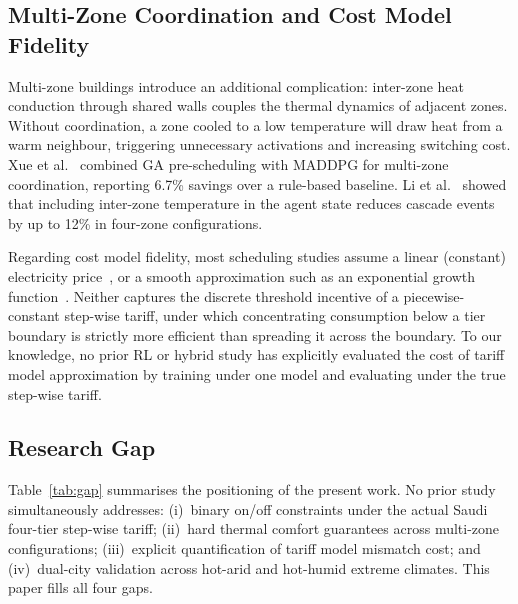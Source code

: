 \documentclass[12pt,a4paper]{article}
\let\oldsubsection\subsection
\renewcommand{\subsection}[1]{\FloatBarrier\oldsubsection{#1}}
\begin{document}
\subsection{Multi-Zone Coordination and Cost Model Fidelity}

\begin{sloppypar}
Multi-zone buildings introduce an additional complication: inter-zone
heat conduction through shared walls couples the thermal dynamics of
adjacent zones.
Without coordination, a zone cooled to a low temperature will draw heat
from a warm neighbour, triggering unnecessary activations and increasing
switching cost.
Xue et al.~\cite{Xue2025} combined GA pre-scheduling with MADDPG
for multi-zone coordination, reporting 6.7\% savings over a rule-based
baseline.
Li et al.~\cite{Li2024MZ} showed that including inter-zone temperature
in the agent state reduces cascade events by up to 12\% in four-zone
configurations.
\end{sloppypar}

Regarding cost model fidelity, most scheduling studies assume a linear
(constant) electricity price~\cite{ElMakroum2023,Gonçalves2022}, or a
smooth approximation such as an exponential growth
function~\cite{Risbeck2017}.
Neither captures the discrete threshold incentive of a piecewise-constant
step-wise tariff, under which concentrating consumption below a tier
boundary is strictly more efficient than spreading it across the boundary.
To our knowledge, no prior RL or hybrid study has explicitly evaluated the
cost of tariff model approximation by training under one model and
evaluating under the true step-wise tariff.

\subsection{Research Gap}

Table~\ref{tab:gap} summarises the positioning of the present work.
No prior study simultaneously addresses: (i)~binary on/off constraints
under the actual Saudi four-tier step-wise tariff; (ii)~hard thermal
comfort guarantees across multi-zone configurations; (iii)~explicit
quantification of tariff model mismatch cost; and (iv)~dual-city
validation across hot-arid and hot-humid extreme climates.
This paper fills all four gaps.
\end{document}
